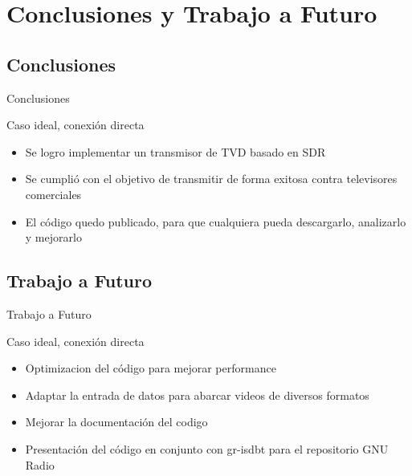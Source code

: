 \section{Conclusiones y Trabajo a Futuro}

\subsection{Conclusiones}

\begin{frame}{Conclusiones}
\begin{block}{Caso ideal, conexión directa}
	\begin{itemize}
		\item { Se logro implementar un transmisor de TVD basado en SDR }
		\item { Se cumplió con el objetivo de transmitir de forma exitosa contra televisores comerciales }
		\item { El código quedo publicado, para que cualquiera pueda descargarlo, analizarlo y mejorarlo}
	\end{itemize}
\end{block}
\end{frame}

\subsection{Trabajo a Futuro}

\begin{frame}{Trabajo a Futuro}
\begin{block}{Caso ideal, conexión directa}
	\begin{itemize}
		\item { Optimizacion del código para mejorar performance }
		\item { Adaptar la entrada de datos para abarcar videos de diversos formatos }
		\item { Mejorar la documentación del codigo}
		\item { Presentación del código en conjunto con gr-isdbt para el repositorio GNU Radio}
	\end{itemize}
\end{block}
\end{frame}
